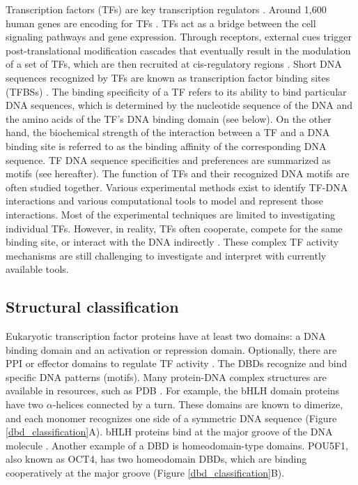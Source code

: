   Transcription factors (TFs) are key transcription regulators \cite{mitsis2020transcription,weidemuller2021transcription}. Around 1,600 human genes are encoding for TFs \cite{lambert2018human,wingender2013tfclass}. TFs act as a bridge between the cell signaling pathways and gene expression. Through receptors, external cues trigger post-translational modification cascades that eventually result in the modulation of a set of TFs, which are then recruited at cis-regulatory regions \cite{weidemuller2021transcription}. Short DNA sequences recognized by TFs are known as transcription factor binding sites (TFBSs) \cite{lambert2018human}. The binding specificity of a TF refers to its ability to bind particular DNA sequences, which is determined by the nucleotide sequence of the DNA and the amino acids of the TF's DNA binding domain (see below). On the other hand, the biochemical strength of the interaction between a TF and a DNA binding site is referred to as the binding affinity of the corresponding DNA sequence. TF DNA sequence specificities and preferences are summarized as motifs (see hereafter). The function of TFs and their recognized DNA motifs are often studied together. Various experimental methods exist to identify TF-DNA interactions and various computational tools to model and represent those interactions. Most of the experimental techniques are limited to investigating individual TFs. However, in reality, TFs often cooperate, compete for the same binding site, or interact with the DNA indirectly \cite{mitsis2020transcription}. These complex TF activity mechanisms are still challenging to investigate and interpret with currently available tools.

    \subsection{Structural classification}

    Eukaryotic transcription factor proteins have at least two domains: a DNA binding domain and an activation or repression domain. Optionally, there are \ac{PPI} or effector domains to regulate TF activity \cite{zhu2011mapping,minchin201393,wingender2013criteria}. The \ac{DBDs} recognize and bind specific DNA patterns (motifs). Many protein-DNA complex structures are available in resources, such as \ac{PDB} \cite{yesudhas2017proteins,berman2000protein,wingender2013criteria}. For example, the \ac{bHLH} domain proteins have two \( \alpha \)-helices connected by a turn. These domains are known to dimerize, and each monomer recognizes one side of a symmetric DNA sequence ({Figure \ref{dbd_classification}}A). bHLH proteins bind at the major groove of the DNA molecule \cite{yesudhas2017proteins}. Another example of a DBD is homeodomain-type domains. POU5F1, also known as OCT4, has two homeodomain DBDs, which are binding cooperatively at the major groove ({Figure \ref{dbd_classification}}B).

